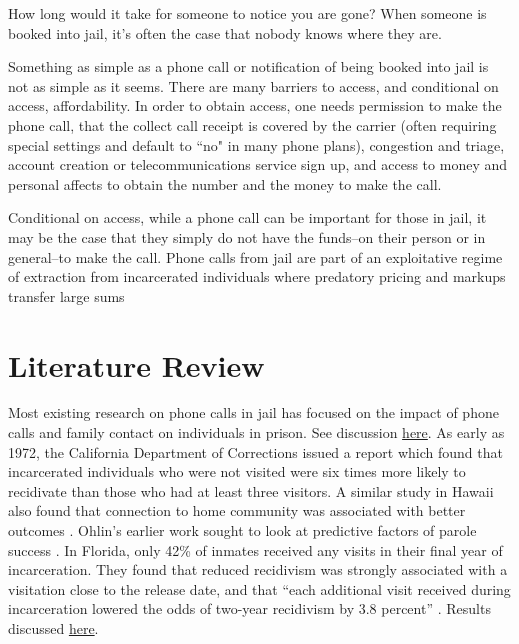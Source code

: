 \documentclass[12pt, a4paper]{article}
\begin{document}
How long would it take for someone to notice you are gone? When someone is booked into jail, it's often the case that nobody knows where they are.

Something as simple as a phone call or notification of being booked into jail is not as simple as it seems. There are many barriers to access, and conditional on access, affordability. In order to obtain access, one needs permission to make the phone call, that the collect call receipt is covered by the carrier (often requiring special settings and default to ``no" in many phone plans), congestion and triage, account creation or telecommunications service sign up, and access to money and personal affects to obtain the number and the money to make the call. 

Conditional on access, while a phone call can be important for those in jail, it may be the case that they simply do not have the funds--on their person or in general--to make the call. Phone calls from jail are part of an exploitative regime of extraction from incarcerated individuals where predatory pricing and markups transfer large sums

\section{Literature Review}

Most existing research on phone calls in jail has focused on the impact of phone calls and family contact on individuals in prison. See discussion \href{https://www.prisonpolicy.org/blog/2021/12/21/family_contact/}{here}. As early as 1972, the California Department of Corrections issued a report \citep{HoltMiller1972} which found that incarcerated individuals who were not visited were six times more likely to recidivate than those who had at least three visitors. A similar study in Hawaii also found that connection to home community was associated with better outcomes \citep{AdamsFischer1976}. Ohlin's earlier work sought to look at predictive factors of parole success \citep{ohlin_selection_1951}. In Florida, only 42\% of inmates received any visits in their final year of incarceration. They found that reduced recidivism was strongly associated with a visitation close to the release date, and that ``each additional visit received during incarceration lowered the odds of two-year recidivism by 3.8 percent'' \citep{BalesMears2008}. Results discussed \href{https://www.prisonpolicy.org/blog/2018/01/30/knox_report/}{here}.
\end{document}
